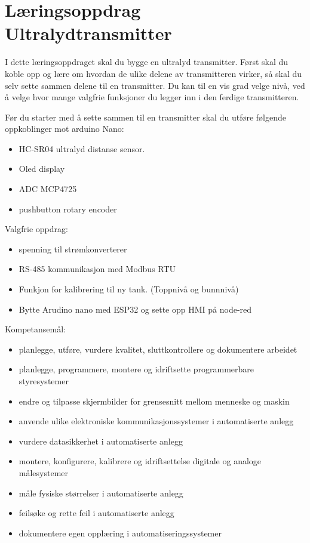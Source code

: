 
\noindent
\section*{Læringsoppdrag Ultralydtransmitter}

\vskip 5pt
I dette læringsoppdraget skal du bygge en ultralyd transmitter. Først skal du koble opp og lære om hvordan de ulike delene av transmitteren virker, så skal du selv sette sammen delene til en transmitter. Du kan til en vis grad velge nivå, ved å velge hvor mange valgfrie funksjoner du legger inn i den ferdige transmitteren. 

Før du  starter med å sette sammen til en transmitter skal du utføre følgende oppkoblinger mot arduino Nano:
\begin{itemize}[noitemsep]
	\item HC-SR04 ultralyd distanse sensor. 
	\item Oled display
	\item ADC MCP4725
	\item pushbutton rotary encoder
\end{itemize}

\vskip 5pt 
Valgfrie oppdrag:

\vskip 5pt 
\begin{itemize}[noitemsep]
	\item spenning til strømkonverterer
	\item RS-485 kommunikasjon med Modbus RTU
	\item Funkjon for kalibrering til ny  tank. (Toppnivå og bunnnivå)
	\item Bytte Arudino nano med ESP32 og sette opp HMI på node-red
\end{itemize}



\vskip 2.5pt 
Kompetansemål:
\begin{itemize}[noitemsep]

	\item planlegge, utføre, vurdere kvalitet, sluttkontrollere og dokumentere arbeidet
	\item planlegge, programmere, montere og idriftsette programmerbare styresystemer
	\item endre og tilpasse skjermbilder for grensesnitt mellom menneske og maskin
	\item anvende ulike elektroniske kommunikasjonssystemer i automatiserte anlegg
	\item vurdere datasikkerhet i automatiserte anlegg
	\item montere, konfigurere, kalibrere og idriftsettelse digitale og analoge målesystemer
	\item måle fysiske størrelser i automatiserte anlegg
	\item feilsøke og rette feil i automatiserte anlegg
	\item dokumentere egen opplæring i automatiseringssystemer
\end{itemize}

